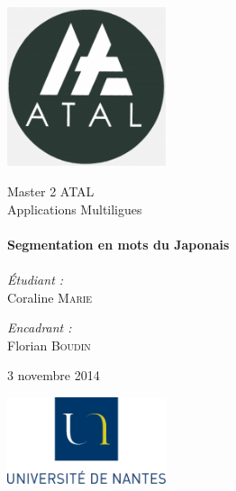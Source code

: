 
\begin{titlepage}
	\begin{center}

		\includegraphics[width=0.35\textwidth]{Figures/ATAL.png}~

		\LARGE{Master 2 \textsc{ATAL}}\\[1.5cm]

		\Large{Applications Multiligues}\\[0.5cm]

		\HRule \\[0.4cm]
		{ \huge \bfseries Segmentation en mots du Japonais \\[0.4cm] }
		\HRule \\[1.5cm]

		\normalsize		
		\emph{\'Etudiant :}\\
		Coraline \textsc{Marie}

		\vspace{0.5cm}

		\emph{Encadrant :} \\
		Florian \textsc{Boudin}

		\vspace{1cm}

		{\large 3 novembre 2014}

		\vfill

		
		\includegraphics[width=0.35\textwidth]{Figures/logoUN.png}~\\[2cm]

	\end{center}
\end{titlepage}
